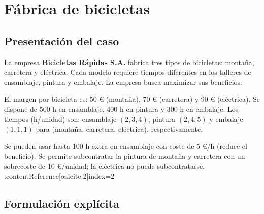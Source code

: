 \section{Fábrica de bicicletas}

\subsection{Presentación del caso}

La empresa \textbf{Bicicletas Rápidas S.A.} fabrica tres tipos de bicicletas: montaña, carretera y eléctrica. Cada modelo requiere tiempos diferentes en los talleres de ensamblaje, pintura y embalaje. La empresa busca maximizar sus beneficios.

El margen por bicicleta es: 50 € (montaña), 70 € (carretera) y 90 € (eléctrica). Se dispone de 500 h en ensamblaje, 400 h en pintura y 300 h en embalaje. Los tiempos (h/unidad) son: ensamblaje \((2,3,4)\), pintura \((2,4,5)\) y embalaje \((1,1,1)\) para (montaña, carretera, eléctrica), respectivamente. 

Se pueden usar hasta 100 h extra en ensamblaje con coste de 5 €/h (reduce el beneficio). Se permite subcontratar la pintura de montaña y carretera con un sobrecoste de 10 €/unidad; la eléctrica no puede subcontratarse. :contentReference[oaicite:2]{index=2}


\subsection{Formulación explícita}



